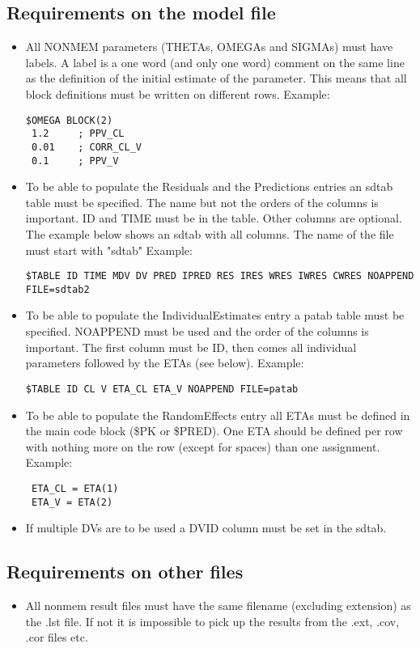 \subsection{Requirements on the model file}
\begin{itemize}
    \item All NONMEM parameters (THETAs, OMEGAs and SIGMAs) must have labels. A label is a one word (and only one word) comment on the same line as the definition of the initial estimate of the parameter. This means that all block definitions must be written on different rows. Example:
        \begin{verbatim}
$OMEGA BLOCK(2)
 1.2     ; PPV_CL
 0.01    ; CORR_CL_V
 0.1     ; PPV_V
        \end{verbatim}
    \item To be able to populate the Residuals and the Predictions entries an sdtab table must be specified. The name but not the orders of the columns is important. ID and TIME must be in the table. Other columns are optional. The example below shows an sdtab with all columns. The name of the file must start with "sdtab" Example:
        \begin{verbatim}
$TABLE ID TIME MDV DV PRED IPRED RES IRES WRES IWRES CWRES NOAPPEND FILE=sdtab2
        \end{verbatim}
    \item To be able to populate the IndividualEstimates entry a patab table must be specified. NOAPPEND must be used and the order of the columns is important. The first column must be ID, then comes all individual parameters followed by the ETAs (see below). Example:
        \begin{verbatim}
$TABLE ID CL V ETA_CL ETA_V NOAPPEND FILE=patab
        \end{verbatim}
    \item To be able to populate the RandomEffects entry all ETAs must be defined in the main code block (\$PK or \$PRED). One ETA should be defined per row with nothing more on the row (except for spaces) than one assignment. Example:
        \begin{verbatim}
 ETA_CL = ETA(1)
 ETA_V = ETA(2)
        \end{verbatim}
    \item If multiple DVs are to be used a DVID column must be set in the sdtab.
\end{itemize}


\subsection{Requirements on other files}
\begin{itemize}
    \item All nonmem result files must have the same filename (excluding extension) as the .lst file. If not it is impossible to pick up the results from the .ext, .cov, .cor files etc.
\end{itemize}

